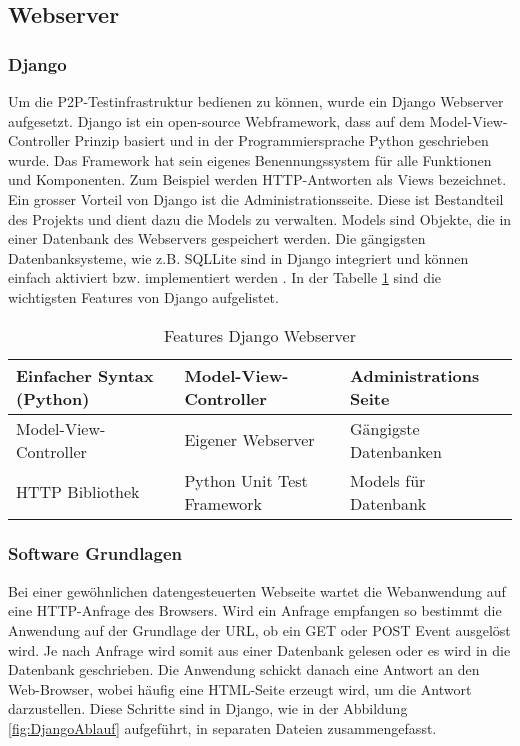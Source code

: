 \subsection{Webserver}\label{subsec:DjangoWebserver}
\subsubsection{Django}\label{subsubsec:Django}
Um die P2P-Testinfrastruktur bedienen zu können, wurde ein Django Webserver aufgesetzt.
Django ist ein open-source Webframework, dass auf dem Model-View-Controller Prinzip basiert und in der Programmiersprache Python geschrieben wurde.
Das Framework hat sein eigenes Benennungssystem für alle Funktionen und Komponenten.
Zum Beispiel werden HTTP-Antworten als Views bezeichnet.
Ein grosser Vorteil von Django ist die Administrationsseite.
Diese ist Bestandteil des Projekts und dient dazu die Models zu verwalten. Models sind Objekte, die in einer Datenbank des Webservers gespeichert werden. Die gängigsten Datenbanksysteme, wie z.B. SQLLite sind in Django integriert und können einfach aktiviert bzw. implementiert werden \cite{django_django_2020}. In der Tabelle \ref{table:FeaturesDjango} sind die wichtigsten Features von Django aufgelistet.


\begin{table}[h]
\centering
\begin{tabular}{|l|l|l|} 
\hline
Einfacher Syntax (Python) & Model-View-Controller & Administrations Seite \\ 
\hline
Model-View-Controller & Eigener Webserver & Gängigste Datenbanken \\ 
\hline
HTTP Bibliothek & Python Unit Test Framework & Models für Datenbank \\
\hline
\end{tabular}
\caption{Features Django Webserver \cite{django_django_2020}}
\label{table:FeaturesDjango}
\end{table}

\subsubsection{Software Grundlagen}\label{subsubsec:SoftwareGrundlagen}
Bei einer gewöhnlichen datengesteuerten Webseite wartet die Webanwendung auf eine HTTP-Anfrage des Browsers.
Wird ein Anfrage empfangen so bestimmt die Anwendung auf der Grundlage der URL, ob ein GET oder POST Event ausgelöst wird.
Je nach Anfrage wird somit aus einer Datenbank gelesen oder es wird in die Datenbank geschrieben.
Die Anwendung schickt danach eine Antwort an den Web-Browser, wobei häufig eine HTML-Seite erzeugt wird, um die Antwort darzustellen. Diese Schritte sind in Django, wie in der Abbildung \ref{fig:DjangoAblauf} aufgeführt,  in separaten Dateien zusammengefasst.


